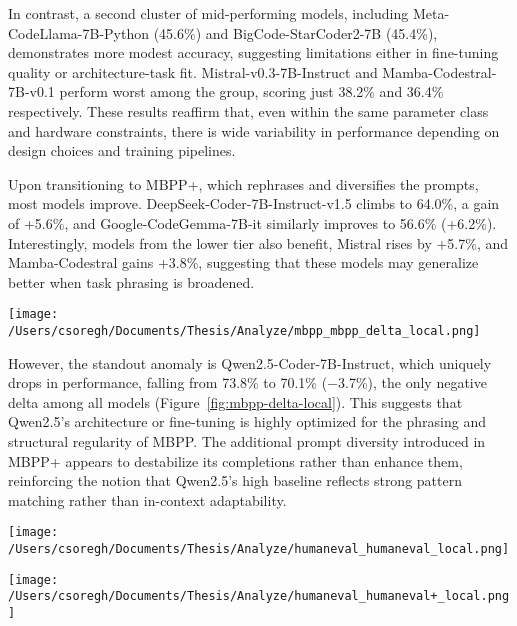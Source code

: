 In contrast, a second cluster of mid-performing models, including Meta-CodeLlama-7B-Python (45.6\%) and BigCode-StarCoder2-7B (45.4\%), demonstrates more modest accuracy, suggesting limitations either in fine-tuning quality or architecture-task fit. Mistral-v0.3-7B-Instruct and Mamba-Codestral-7B-v0.1 perform worst among the group, scoring just 38.2\% and 36.4\% respectively. These results reaffirm that, even within the same parameter class and hardware constraints, there is wide variability in performance depending on design choices and training pipelines.

Upon transitioning to MBPP+, which rephrases and diversifies the prompts, most models improve. DeepSeek-Coder-7B-Instruct-v1.5 climbs to 64.0\%, a gain of +5.6\%, and Google-CodeGemma-7B-it similarly improves to 56.6\% (+6.2\%). Interestingly, models from the lower tier also benefit, Mistral rises by +5.7\%, and Mamba-Codestral gains +3.8\%, suggesting that these models may generalize better when task phrasing is broadened.

\begin{center}
	\texttt{[image: /Users/csoregh/Documents/Thesis/Analyze/mbpp\_mbpp\_delta\_local.png]}
	\label{fig:mbpp-delta-local}
\end{center}

However, the standout anomaly is Qwen2.5-Coder-7B-Instruct, which uniquely drops in performance, falling from 73.8\% to 70.1\% (−3.7\%), the only negative delta among all models (Figure~\ref{fig:mbpp-delta-local}). This suggests that Qwen2.5’s architecture or fine-tuning is highly optimized for the phrasing and structural regularity of MBPP. The additional prompt diversity introduced in \gls{MBPP}+ appears to destabilize its completions rather than enhance them, reinforcing the notion that Qwen2.5’s high baseline reflects strong pattern matching rather than in-context adaptability.

\begin{center}
	\texttt{[image: /Users/csoregh/Documents/Thesis/Analyze/humaneval\_humaneval\_local.png]}
	\label{fig:humaneval-local}
\end{center}

\begin{center}
	\texttt{[image: /Users/csoregh/Documents/Thesis/Analyze/humaneval\_humaneval+\_local.png]}
	\label{fig:humanevalplus-local}
\end{center}

